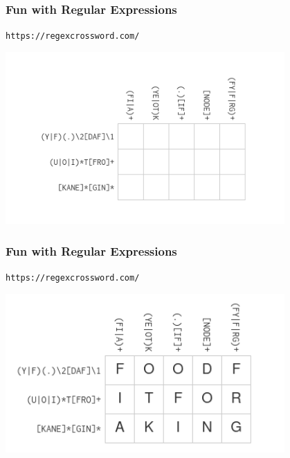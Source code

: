 \documentclass{beamer}
\begin{document}
\begin{frame}[fragile]
\frametitle{Fun with Regular Expressions}
\texttt{https://regexcrossword.com/}
\begin{center}
\includegraphics[width=0.8\textwidth]{pics/crosswords}
\end{center}
\end{frame}

\begin{frame}[fragile]
\frametitle{Fun with Regular Expressions}
\texttt{https://regexcrossword.com/}
\begin{center}
\includegraphics[width=0.8\textwidth]{pics/crosswords-solved}
\end{center}
\end{frame}
\end{document}
